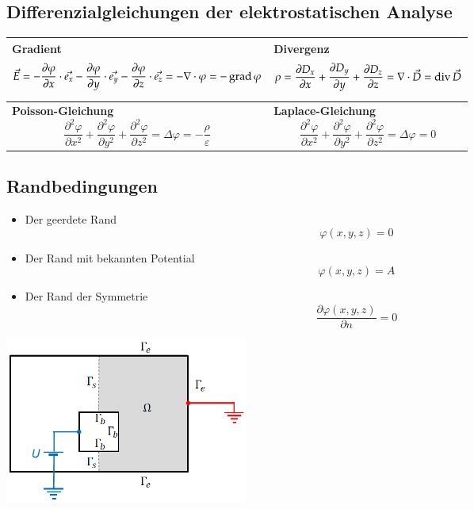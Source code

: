 \subsection{Differenzialgleichungen der elektrostatischen Analyse}
\begin{tabular}{|p{} |p{}|}
	\hline
	\textbf{Gradient}\newline
	\[ \vec{E}= - \dfrac{\partial\varphi}{\partial x} \cdot \vec{e_{x}} -  \dfrac{\partial\varphi}{\partial y} \cdot \vec{e_{y}}- \dfrac{\partial\varphi}{\partial z} \cdot \vec{e_{z}} = -\nabla \cdot \varphi = -\operatorname{grad} \varphi\]&
	\textbf{Divergenz}\newline
	\[ \rho= \dfrac{\partial D_{x}}{\partial x} +  \dfrac{\partial D_{y}}{\partial y} + \dfrac{\partial D_{z}}{\partial z}= \nabla \cdot \vec{D}= \operatorname{div} \vec{D} \]\\
	\hline
	\textbf{Poisson-Gleichung}\newline
	\[ \dfrac{\partial^2\varphi}{\partial x^2} +  \dfrac{\partial^2\varphi}{\partial y^2} + \dfrac{\partial^2\varphi}{\partial z^2} =\Delta \varphi = -\dfrac{\rho}{\varepsilon} \]&
	\textbf{Laplace-Gleichung}  \[ \dfrac{\partial^2\varphi}{\partial x^2} +  \dfrac{\partial^2\varphi}{\partial y^2} + \dfrac{\partial^2\varphi}{\partial z^2} =\Delta \varphi = 0 \]\\
	\hline
\end{tabular}
\subsection{Randbedingungen}
\begin{minipage}{8cm}
	\begin{itemize}
		\item Der geerdete Rand \[\varphi(x,y,z) = 0\]
		\item Der Rand mit bekannten Potential \[ \varphi(x,y,z) = A \]
		\item Der Rand der Symmetrie \[ \dfrac{\partial\varphi(x,y,z)}{\partial n} = 0\]
	\end{itemize}
\end{minipage}
\begin{minipage}{8cm}
	\includegraphics[width=8cm]{images/randbedinung_ES.png}
\end{minipage}
